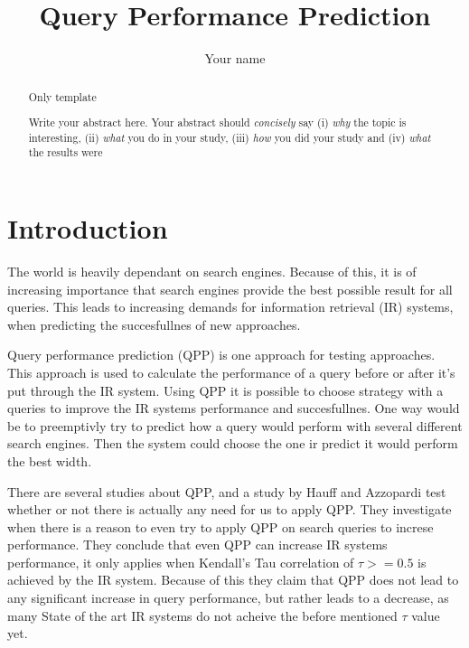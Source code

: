 \documentclass{sig-alternate}
\begin{document}
\title{Query Performance Prediction}
\author{
\alignauthor 
Your name
}
\maketitle

\begin{abstract}
Only template

Write your abstract here. Your abstract should \emph{concisely} say (i) \emph{why} the topic is interesting, (ii) \emph{what} you do in your study, (iii) \emph{how} you did your study and (iv) \emph{what} the results were
\end{abstract}

\section{Introduction}
The world is heavily dependant on search engines. Because of this, it is of increasing importance that search engines provide the best possible result for all queries. This leads to increasing demands for information retrieval (IR) systems, when predicting the succesfullnes of new approaches.

Query performance prediction (QPP) is one approach for testing approaches. This approach is used to calculate the performance of a query before or after it's put through the IR system. Using QPP it is possible to choose strategy with a queries to improve the IR systems performance and succesfullnes. One way would be to preemptivly try to predict how a query would perform with several different search engines. Then the system could choose the one ir predict it would perform the best width.

There are several studies about QPP, and a study by Hauff and Azzopardi\cite{review1} test whether or not there is actually any need for us to apply QPP. They investigate when there is a reason to even try to apply QPP on search queries to increse performance. They conclude that even QPP can increase IR systems performance, it only applies when Kendall's Tau correlation of $\tau >= 0.5$ is achieved by the IR system. Because of this they claim that QPP does not lead to any significant increase in query performance, but rather leads to a decrease, as many State of the art IR systems do not acheive the before mentioned $\tau$ value yet. 
\end{document}
